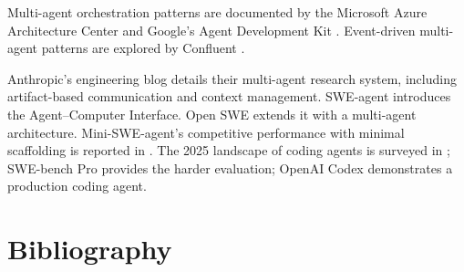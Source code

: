 \documentclass[11pt]{book}
\begin{document}
Multi-agent orchestration patterns are documented by the Microsoft Azure Architecture Center \cite{msagentpatterns2025} and Google's Agent Development Kit \cite{googleadk2025}. Event-driven multi-agent patterns are explored by Confluent \cite{confluentmas2025}.

Anthropic's engineering blog \cite{anthropicresearch2025} details their multi-agent research system, including artifact-based communication and context management. SWE-agent \cite{sweagent2024} introduces the Agent--Computer Interface. Open SWE \cite{openswe2025} extends it with a multi-agent architecture. Mini-SWE-agent's competitive performance with minimal scaffolding is reported in \cite{springaibench2025}. The 2025 landscape of coding agents is surveyed in \cite{sweevo2025}; SWE-bench Pro \cite{swebenchpro2025} provides the harder evaluation; OpenAI Codex \cite{openaicodex2025} demonstrates a production coding agent.

\section*{Bibliography}
\end{document}
